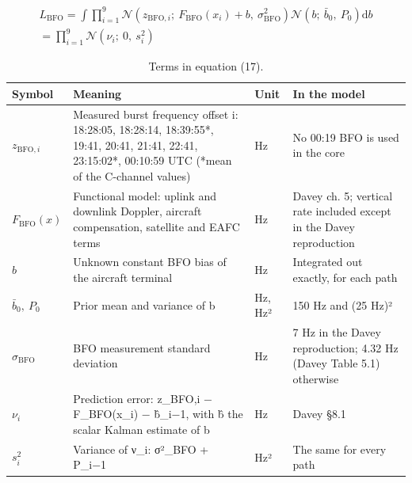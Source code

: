 \begin{multline}
L_{\mathrm{BFO}} = \int \prod_{i=1}^{9} \mathcal{N}\left(z_{\mathrm{BFO},i};\ F_{\mathrm{BFO}}\left(x_{i}\right) + b,\ \sigma_{\mathrm{BFO}}^{2}\right) \mathcal{N}\left(b;\ \bar{b}_{0},\ P_{0}\right) \mathrm{d}b \\ = \prod_{i=1}^{9} \mathcal{N}\left(\nu_{i};\ 0,\ s_{i}^{2}\right)
\label{eq:17}
\end{multline}
\begin{table}[h]
\caption{Terms in equation (17).}
\small
\begin{tabular}{p{2.4cm}p{4.6cm}p{1.1cm}p{4.0cm}}
\hline
Symbol & Meaning & Unit & In the model \\
\hline
$z_{\mathrm{BFO},i}$ & Measured burst frequency offset i: 18:28:05, 18:28:14, 18:39:55*, 19:41, 20:41, 21:41, 22:41, 23:15:02*, 00:10:59 UTC (*mean of the C-channel values) & Hz & No 00:19 BFO is used in the core \\
$F_{\mathrm{BFO}}(x)$ & Functional model: uplink and downlink Doppler, aircraft compensation, satellite and EAFC terms & Hz & Davey ch. 5; vertical rate included except in the Davey reproduction \\
$b$ & Unknown constant BFO bias of the aircraft terminal & Hz & Integrated out exactly, for each path \\
$\bar{b}_{0},\ P_{0}$ & Prior mean and variance of b & Hz, Hz² & 150 Hz and (25 Hz)² \\
$\sigma_{\mathrm{BFO}}$ & BFO measurement standard deviation & Hz & 7 Hz in the Davey reproduction; 4.32 Hz (Davey Table 5.1) otherwise \\
$\nu_{i}$ & Prediction error: z\_BFO,i − F\_BFO(x\_i) − b̂\_{i−1}, with b̂ the scalar Kalman estimate of b & Hz & Davey §8.1 \\
$s_{i}^{2}$ & Variance of ν\_i: σ²\_BFO + P\_{i−1} & Hz² & The same for every path \\
\hline
\end{tabular}
\end{table}

